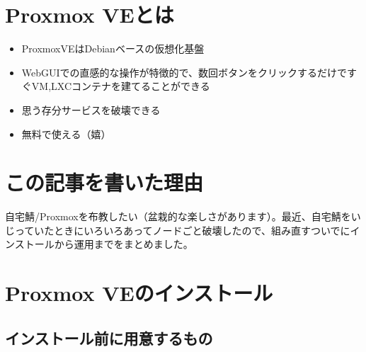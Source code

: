\maketitle
\vspace{-2\baselineskip}

\setcounter{tocdepth}{2}
\tableofcontents
\thispagestyle{empty}
\vspace{0.6\baselineskip}

\section{Proxmox VEとは}

{\small
\begin{itemize}[topsep=0pt,itemsep=0pt,parsep=0pt,partopsep=0pt]
\item ProxmoxVEはDebianベースの仮想化基盤\cite{proxmox-ve}
\item WebGUIでの直感的な操作が特徴的で、数回ボタンをクリックするだけですぐVM,LXCコンテナを建てることができる
\item 思う存分サービスを破壊できる
\item 無料で使える（嬉）
\end{itemize}
}


\section{この記事を書いた理由}

自宅鯖/Proxmoxを布教したい（盆栽的な楽しさがあります）。最近、自宅鯖をいじっていたときにいろいろあってノードごと破壊したので、組み直すついでにインストールから運用までをまとめました。

\section{Proxmox VEのインストール}

\subsection{インストール前に用意するもの}

